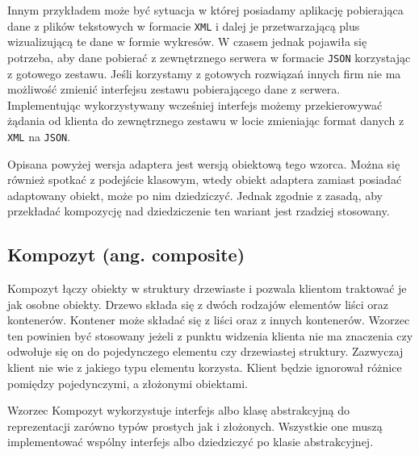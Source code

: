 Innym przykładem może być sytuacja w której posiadamy aplikację pobierająca dane z plików tekstowych w formacie \texttt{XML} i dalej je przetwarzającą plus wizualizującą te dane w formie wykresów. W czasem jednak pojawiła się potrzeba, aby dane pobierać z zewnętrznego serwera w formacie \texttt{JSON} korzystając z gotowego zestawu. Jeśli korzystamy z gotowych rozwiązań innych firm nie ma możliwość zmienić interfejsu zestawu pobierającego  dane z serwera. Implementując wykorzystywany wcześniej interfejs możemy przekierowywać żądania od klienta do zewnętrznego zestawu w locie zmieniając format danych z \texttt{XML} na \texttt{JSON}.

Opisana powyżej wersja adaptera jest wersją obiektową tego wzorca. Można się również spotkać z podejście klasowym, wtedy obiekt adaptera zamiast posiadać adaptowany obiekt, może po nim dziedziczyć. Jednak zgodnie z zasadą, aby przekładać kompozycję nad dziedziczenie ten wariant jest rzadziej stosowany. 




\subsection{Kompozyt (ang. composite)}

Kompozyt łączy obiekty w struktury drzewiaste i pozwala klientom traktować je jak osobne obiekty. Drzewo składa się z dwóch rodzajów elementów liści oraz kontenerów. Kontener może składać się z liści oraz z innych kontenerów. Wzorzec ten powinien być stosowany jeżeli z punktu widzenia klienta nie ma znaczenia czy odwołuje się on do pojedynczego elementu czy drzewiastej struktury. Zazwyczaj klient nie wie z jakiego typu elementu korzysta. Klient będzie ignorował różnice pomiędzy pojedynczymi, a złożonymi obiektami.

Wzorzec Kompozyt wykorzystuje interfejs albo klasę abstrakcyjną do reprezentacji zarówno typów prostych jak i złożonych. Wszystkie one muszą implementować wspólny interfejs albo dziedziczyć po klasie abstrakcyjnej.
 
